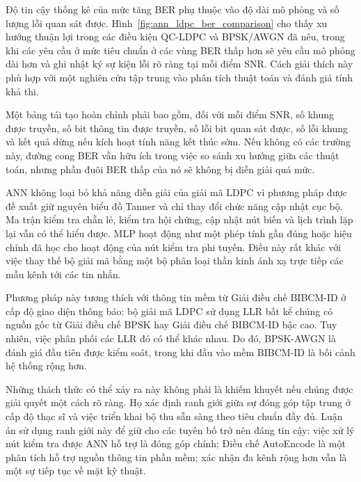 Độ tin cậy thống kê của mức tăng BER phụ thuộc vào độ dài mô phỏng và số lượng lỗi quan sát được. Hình~\ref{fig:ann_ldpc_ber_comparison} cho thấy xu hướng thuận lợi trong các điều kiện QC-LDPC và BPSK/AWGN đã nêu, trong khi các yêu cầu ở mức tiêu chuẩn ở các vùng BER thấp hơn sẽ yêu cầu mô phỏng dài hơn và ghi nhật ký sự kiện lỗi rõ ràng tại mỗi điểm SNR. Cách giải thích này phù hợp với một nghiên cứu tập trung vào phân tích thuật toán và đánh giá tính khả thi.

Một bảng tái tạo hoàn chỉnh phải bao gồm, đối với mỗi điểm SNR, số khung được truyền, số bit thông tin được truyền, số lỗi bit quan sát được, số lỗi khung và kết quả dừng nếu kích hoạt tính năng kết thúc sớm. Nếu không có các trường này, đường cong BER vẫn hữu ích trong việc so sánh xu hướng giữa các thuật toán, nhưng phần đuôi BER thấp của nó sẽ không bị diễn giải quá mức.

ANN không loại bỏ khả năng diễn giải của giải mã LDPC vì phương pháp được đề xuất giữ nguyên biểu đồ Tanner và chỉ thay đổi chức năng cập nhật cục bộ. Ma trận kiểm tra chẵn lẻ, kiểm tra hội chứng, cập nhật nút biến và lịch trình lặp lại vẫn có thể hiểu được. MLP hoạt động như một phép tính gần đúng hoặc hiệu chỉnh đã học cho hoạt động của nút kiểm tra phi tuyến. Điều này rất khác với việc thay thế bộ giải mã bằng một bộ phân loại thần kinh ánh xạ trực tiếp các mẫu kênh tới các tin nhắn.

Phương pháp này tương thích với thông tin mềm từ Giải điều chế BIBCM-ID ở cấp độ giao diện thông báo: bộ giải mã LDPC sử dụng LLR bất kể chúng có nguồn gốc từ Giải điều chế BPSK hay Giải điều chế BIBCM-ID bậc cao. Tuy nhiên, việc phân phối các LLR đó có thể khác nhau. Do đó, BPSK-AWGN là đánh giá đầu tiên được kiểm soát, trong khi đầu vào mềm BIBCM-ID là bối cảnh hệ thống rộng hơn.

Những thách thức có thể xảy ra này không phải là khiếm khuyết nếu chúng được giải quyết một cách rõ ràng. Họ xác định ranh giới giữa sự đóng góp tập trung ở cấp độ thạc sĩ và việc triển khai bộ thu sẵn sàng theo tiêu chuẩn đầy đủ. Luận án sử dụng ranh giới này để giữ cho các tuyên bố trở nên đáng tin cậy: việc xử lý nút kiểm tra được ANN hỗ trợ là đóng góp chính; Điều chế AutoEncode là một phân tích hỗ trợ nguồn thông tin phần mềm; xác nhận đa kênh rộng hơn vẫn là một sự tiếp tục về mặt kỹ thuật.

